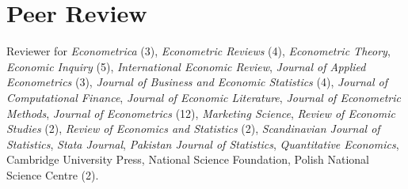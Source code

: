 \documentclass[10pt,letterpaper]{article}
\renewenvironment{itemize}{
  \begin{list}{}{
      \setlength{\leftmargin}{1.5em}
      \setlength{\itemsep}{0.25em}
      \setlength{\parskip}{0pt}
      \setlength{\parsep}{0.25em}
    }
}{
  \end{list}
}
\begin{document}

\section*{Peer Review}

Reviewer for
\textit{Econometrica} (3),
\textit{Econometric Reviews} (4),
\textit{Econometric Theory},
\textit{Economic Inquiry} (5),
\textit{International Economic Review},
\textit{Journal of Applied Econometrics} (3),
\textit{Journal of Business and Economic Statistics} (4),
\textit{Journal of Computational Finance},
\textit{Journal of Economic Literature},
\textit{Journal of Econometric Methods},
\textit{Journal of Econometrics} (12),
\textit{Marketing Science},
\textit{Review of Economic Studies} (2),
\textit{Review of Economics and Statistics} (2),
\textit{Scandinavian Journal of Statistics},
\textit{Stata Journal},
\textit{Pakistan Journal of Statistics},
\textit{Quantitative Economics},
Cambridge University Press,
National Science Foundation,
Polish National Science Centre (2).
\end{document}
